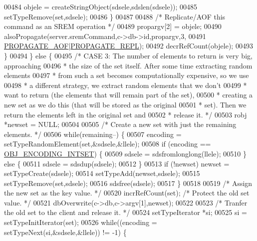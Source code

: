\begin{DoxyCode}
00484                 objele = createStringObject(sdsele,sdslen(sdsele));
00485                 setTypeRemove(set,sdsele);
00486             \}
00487 
00488             \textcolor{comment}{/* Replicate/AOF this command as an SREM operation */}
00489             propargv[2] = objele;
00490             alsoPropagate(server.sremCommand,c->db->id,propargv,3,
00491                 \hyperlink{server_8h_a542fb79924ca427c866fd63632f60777}{PROPAGATE\_AOF}|\hyperlink{server_8h_a59c6e025b4ed85642a0472fc3e73e298}{PROPAGATE\_REPL});
00492             decrRefCount(objele);
00493         \}
00494     \} \textcolor{keywordflow}{else} \{
00495     \textcolor{comment}{/* CASE 3: The number of elements to return is very big, approaching}
00496 \textcolor{comment}{     * the size of the set itself. After some time extracting random elements}
00497 \textcolor{comment}{     * from such a set becomes computationally expensive, so we use}
00498 \textcolor{comment}{     * a different strategy, we extract random elements that we don't}
00499 \textcolor{comment}{     * want to return (the elements that will remain part of the set),}
00500 \textcolor{comment}{     * creating a new set as we do this (that will be stored as the original}
00501 \textcolor{comment}{     * set). Then we return the elements left in the original set and}
00502 \textcolor{comment}{     * release it. */}
00503         robj *newset = NULL;
00504 
00505         \textcolor{comment}{/* Create a new set with just the remaining elements. */}
00506         \textcolor{keywordflow}{while}(remaining--) \{
00507             encoding = setTypeRandomElement(set,&sdsele,&llele);
00508             \textcolor{keywordflow}{if} (encoding == \hyperlink{server_8h_a214173987de21c3b7661fddd42b05873}{OBJ\_ENCODING\_INTSET}) \{
00509                 sdsele = sdsfromlonglong(llele);
00510             \} \textcolor{keywordflow}{else} \{
00511                 sdsele = sdsdup(sdsele);
00512             \}
00513             \textcolor{keywordflow}{if} (!newset) newset = setTypeCreate(sdsele);
00514             setTypeAdd(newset,sdsele);
00515             setTypeRemove(set,sdsele);
00516             sdsfree(sdsele);
00517         \}
00518 
00519         \textcolor{comment}{/* Assign the new set as the key value. */}
00520         incrRefCount(set); \textcolor{comment}{/* Protect the old set value. */}
00521         dbOverwrite(c->db,c->argv[1],newset);
00522 
00523         \textcolor{comment}{/* Tranfer the old set to the client and release it. */}
00524         setTypeIterator *si;
00525         si = setTypeInitIterator(set);
00526         \textcolor{keywordflow}{while}((encoding = setTypeNext(si,&sdsele,&llele)) != -1) \{

\end{DoxyCode}
